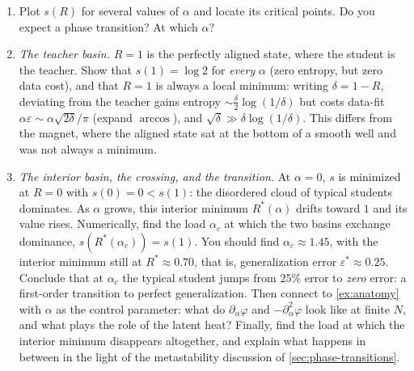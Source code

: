 \documentclass[11pt]{article}
\newcommand{\E}{\mathbb{E}}
\newcommand{\pd}{\partial}
\begin{document}
\begin{exercise}
\begin{enumerate}
\begin{equation}
        \E_x Z \;\approx\; \int_{-1}^{1}dR\; e^{-N\,s(R)}\,,\qquad s(R) = \log 2 - h(R) - \alpha\log\big(1-\varepsilon(R)\big)\,. \label{perc-action}
    \end{equation}
    This is the exact analogue of the magnet's \eqref{ising-action}: an entropy term counting states, and a ``field'' term rewarding alignment. The aligning field is now the \emph{data}, and its strength is the load $\alpha$. (Averaging $Z$ rather than $\log Z$ is the annealed approximation \eqref{annealed-swap}. It preserves all the qualitative structure here and shifts the numbers only slightly; \cref{app:replica} explains how to do the exact calculation.)
    \item Plot $s(R)$ for several values of $\alpha$ and locate its critical points. Do you expect a phase transition? At which $\alpha$?
    \item\label{ex:ising-f} \emph{The teacher basin.} $R=1$ is the perfectly aligned state, where the student is the teacher. Show that $s(1) = \log 2$ for \emph{every} $\alpha$ (zero entropy, but zero data cost), and that $R=1$ is always a local minimum: writing $\delta = 1-R$, deviating from the teacher gains entropy $\sim\frac{\delta}{2}\log(1/\delta)$ but costs data-fit $\alpha\varepsilon\sim\alpha\sqrt{2\delta}/\pi$ (expand $\arccos$), and $\sqrt\delta\gg\delta\log(1/\delta)$. This differs from the magnet, where the aligned state sat at the bottom of a smooth well and was not always a minimum.
    \item\label{ex:ising-g} \emph{The interior basin, the crossing, and the transition.} At $\alpha=0$, $s$ is minimized at $R=0$ with $s(0) = 0 < s(1)$: the disordered cloud of typical students dominates. As $\alpha$ grows, this interior minimum $R^*(\alpha)$ drifts toward $1$ and its value rises. Numerically, find the load $\alpha_c$ at which the two basins exchange dominance, $s(R^*(\alpha_c)) = s(1)$. You should find $\alpha_c\approx 1.45$, with the interior minimum still at $R^*\approx 0.70$, that is, generalization error $\varepsilon^*\approx 0.25$. Conclude that at $\alpha_c$ the typical student jumps from $25\%$ error to \emph{zero} error: a first-order transition to perfect generalization. Then connect to \cref{ex:anatomy} with $\alpha$ as the control parameter: what do $\pd_\alpha\varphi$ and $-\pd_\alpha^2\varphi$ look like at finite $N$, and what plays the role of the latent heat? Finally, find the load at which the interior minimum disappears altogether, and explain what happens in between in the light of the metastability discussion of \cref{sec:phase-transitions}.

\end{enumerate}
\end{exercise}
\end{document}
